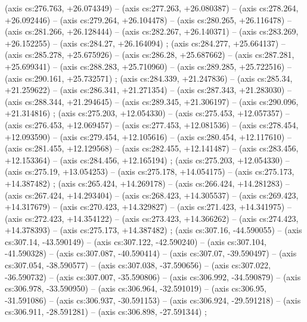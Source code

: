     (axis cs:276.763,    +26.074349) --  (axis cs:277.263,    +26.080387) --  (axis cs:278.264,    +26.092446) --  (axis cs:279.264,    +26.104478) --  (axis cs:280.265,    +26.116478) --  (axis cs:281.266,    +26.128444) --  (axis cs:282.267,    +26.140371) --  (axis cs:283.269,    +26.152255) --  (axis cs:284.27,    +26.164094) ;
    (axis cs:284.277,    +25.664137) --  (axis cs:285.278,    +25.675926) --  (axis cs:286.28,    +25.687662) --  (axis cs:287.281,    +25.699341) --  (axis cs:288.283,    +25.710960) --  (axis cs:289.285,    +25.722516) --  (axis cs:290.161,    +25.732571) ;
    (axis cs:284.339,    +21.247836) --  (axis cs:285.34,    +21.259622) --  (axis cs:286.341,    +21.271354) --  (axis cs:287.343,    +21.283030) --  (axis cs:288.344,    +21.294645) --  (axis cs:289.345,    +21.306197) --  (axis cs:290.096,    +21.314816) ;
    (axis cs:275.203,    +12.054330) --  (axis cs:275.453,    +12.057357) --  (axis cs:276.453,    +12.069457) --  (axis cs:277.453,    +12.081536) --  (axis cs:278.454,    +12.093590) --  (axis cs:279.454,    +12.105616) --  (axis cs:280.454,    +12.117610) --  (axis cs:281.455,    +12.129568) --  (axis cs:282.455,    +12.141487) --  (axis cs:283.456,    +12.153364) --  (axis cs:284.456,    +12.165194) ;
    (axis cs:275.203,    +12.054330) --  (axis cs:275.19,    +13.054253) --  (axis cs:275.178,    +14.054175) --  (axis cs:275.173,    +14.387482) ;
    (axis cs:265.424,    +14.269178) --  (axis cs:266.424,    +14.281283) --  (axis cs:267.424,    +14.293404) --  (axis cs:268.423,    +14.305537) --  (axis cs:269.423,    +14.317679) --  (axis cs:270.423,    +14.329827) --  (axis cs:271.423,    +14.341975) --  (axis cs:272.423,    +14.354122) --  (axis cs:273.423,    +14.366262) --  (axis cs:274.423,    +14.378393) --  (axis cs:275.173,    +14.387482) ;
    (axis cs:307.16,    -44.590055) --  (axis cs:307.14,    -43.590149) --  (axis cs:307.122,    -42.590240) --  (axis cs:307.104,    -41.590328) --  (axis cs:307.087,    -40.590414) --  (axis cs:307.07,    -39.590497) --  (axis cs:307.054,    -38.590577) --  (axis cs:307.038,    -37.590656) --  (axis cs:307.022,    -36.590732) --  (axis cs:307.007,    -35.590806) --  (axis cs:306.992,    -34.590879) --  (axis cs:306.978,    -33.590950) --  (axis cs:306.964,    -32.591019) --  (axis cs:306.95,    -31.591086) --  (axis cs:306.937,    -30.591153) --  (axis cs:306.924,    -29.591218) --  (axis cs:306.911,    -28.591281) --  (axis cs:306.898,    -27.591344) ;

